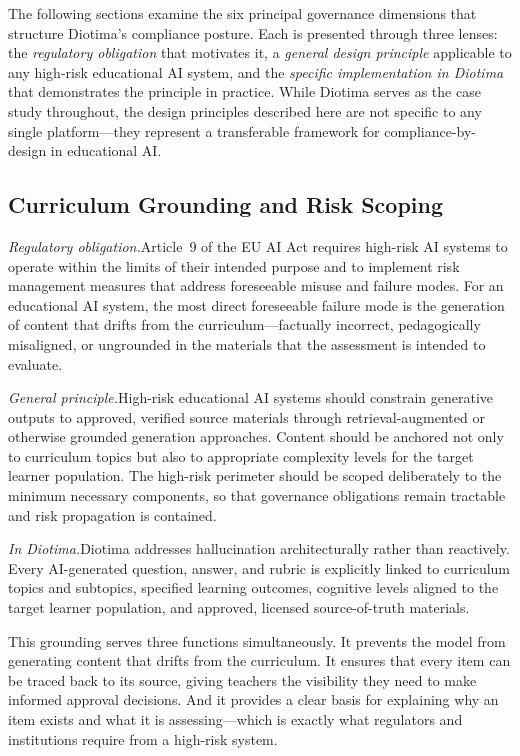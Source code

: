 \documentclass[10pt, a4paper, twocolumn]{article}
\begin{document}
The following sections examine the six principal governance dimensions that structure
Diotima's compliance posture. Each is presented through three lenses: the
\textit{regulatory obligation} that motivates it, a \textit{general design principle}
applicable to any high-risk educational AI system, and the \textit{specific
implementation in Diotima} that demonstrates the principle in practice. While Diotima
serves as the case study throughout, the design principles described here are not
specific to any single platform---they represent a transferable framework for
compliance-by-design in educational AI.

\subsection{Curriculum Grounding and Risk Scoping}

\textit{Regulatory obligation.}\quad Article~9 of the EU AI Act requires high-risk AI
systems to operate within the limits of their intended purpose and to implement risk
management measures that address foreseeable misuse and failure modes. For an
educational AI system, the most direct foreseeable failure mode is the generation of
content that drifts from the curriculum---factually incorrect, pedagogically misaligned,
or ungrounded in the materials that the assessment is intended to evaluate.

\textit{General principle.}\quad High-risk educational AI systems should constrain
generative outputs to approved, verified source materials through retrieval-augmented
or otherwise grounded generation approaches. Content should be anchored not only to
curriculum topics but also to appropriate complexity levels for the target learner
population. The high-risk perimeter should be scoped deliberately to the minimum
necessary components, so that governance obligations remain tractable and risk
propagation is contained.

\textit{In Diotima.}\quad Diotima addresses hallucination architecturally rather
than reactively. Every AI-generated question, answer, and rubric is explicitly linked to
curriculum topics and subtopics, specified learning outcomes, cognitive levels aligned
to the target learner population, and approved, licensed source-of-truth materials.

This grounding serves three functions simultaneously. It prevents the model from
generating content that drifts from the curriculum. It ensures that every item can
be traced back to its source, giving teachers the visibility they need to make informed
approval decisions. And it provides a clear basis for explaining why an item exists and
what it is assessing---which is exactly what regulators and institutions require from
a high-risk system.
\end{document}
